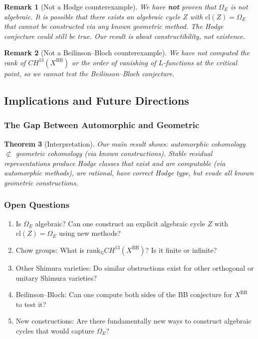 \documentclass[12pt]{amsart}
\newtheorem{theorem}{Theorem}[section]
\newtheorem{remark}[theorem]{Remark}
\theoremstyle{definition}
\newcommand{\Q}{\mathbb{Q}}
\newcommand{\CH}{\mathit{CH}}
\newcommand{\cl}{\mathrm{cl}}
\begin{document}
\begin{remark}[Not a Hodge counterexample]
We have \textbf{not} proven that $\Omega_E$ is not algebraic. It is possible that there exists an algebraic cycle $Z$ with $\cl(Z) = \Omega_E$ that cannot be constructed via any known geometric method. The Hodge conjecture could still be true. Our result is about constructibility, not existence.
\end{remark}

\begin{remark}[Not a Beilinson--Bloch counterexample]
We have not computed the rank of $\CH^{13}(X^{\mathrm{BB}})$ or the order of vanishing of $L$-functions at the critical point, so we cannot test the Beilinson--Bloch conjecture.
\end{remark} \pagebreak

\subsection{Implications and Future Directions}

\subsubsection{The Gap Between Automorphic and Geometric}

\begin{theorem}[Interpretation]
Our main result shows: automorphic cohomology $\not\subset$ geometric cohomology (via known constructions). Stable residual representations produce Hodge classes that exist and are computable (via automorphic methods), are rational, have correct Hodge type, but evade all known geometric constructions.
\end{theorem}

\subsubsection{Open Questions}

\begin{enumerate}
\item Is $\Omega_E$ algebraic? Can one construct an explicit algebraic cycle $Z$ with $\cl(Z) = \Omega_E$ using new methods?
\item Chow groups: What is $\mathrm{rank}_{\Q} \CH^{13}(X^{\mathrm{BB}})$? Is it finite or infinite?
\item Other Shimura varieties: Do similar obstructions exist for other orthogonal or unitary Shimura varieties?
\item Beilinson--Bloch: Can one compute both sides of the BB conjecture for $X^{\mathrm{BB}}$ to test it?
\item New constructions: Are there fundamentally new ways to construct algebraic cycles that would capture $\Omega_E$?
\end{enumerate}
\end{document}
